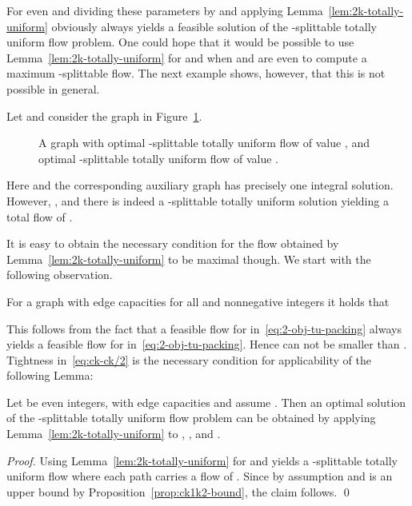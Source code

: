 For even  and  dividing these parameters by  and applying
Lemma~\ref{lem:2k-totally-uniform} obviously always yields a feasible
solution of the -splittable totally uniform flow problem.
One could hope that it would be possible to use
Lemma~\ref{lem:2k-totally-uniform} for  and
 when  and  are even to compute a
maximum -splittable flow. The next example shows, however,
that this is not possible in general.


\begin{example}
 Let  and consider the graph in
  Figure~\ref{fig:factor-2}.
  \begin{figure}
    \begin{center}
    \end{center}
    \caption{A graph with optimal -splittable totally uniform
      flow of value , and optimal -splittable totally uniform
      flow of value .}
    \label{fig:factor-2}
  \end{figure}
  Here  and the corresponding
  auxiliary graph has precisely one integral solution. However,
  , and there is indeed a -splittable totally
  uniform solution yielding a total flow of .
\end{example}

It is easy to obtain the necessary condition for the flow obtained by
Lemma~\ref{lem:2k-totally-uniform} to be maximal though. We start with
the following observation.

\begin{observation}
  For a graph  with edge capacities  for
  all  and nonnegative integers  it holds that
  
\end{observation}

This follows from the fact that a feasible flow  for 
in~\eqref{eq:2-obj-tu-packing} always yields a feasible flow 
for  in~\eqref{eq:2-obj-tu-packing}. Hence  can not be smaller than . Tightness
in~\eqref{eq:ck-ck/2} is the necessary condition for
applicability of the following Lemma:

\begin{lemma}
  Let  be even integers,  with edge capacities
   and assume
  . Then an optimal solution of the
  -splittable totally uniform flow problem can be obtained by
  applying Lemma~\ref{lem:2k-totally-uniform} to , , and .
\end{lemma}
\begin{proof}
  Using Lemma~\ref{lem:2k-totally-uniform} for  and 
  yields a -splittable totally uniform flow where each path
  carries a flow of . Since   by assumption and
   is an upper bound by
  Proposition~\ref{prop:ck1k2-bound}, the claim follows.
\qed \end{proof}


